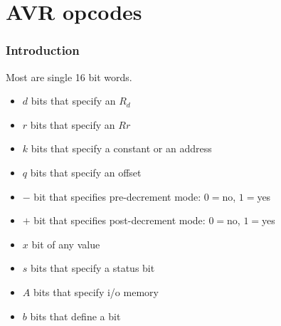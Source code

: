 \documentclass{beamer}
\begin{document}
\section{AVR opcodes}
\begin{frame}
\frametitle{Introduction}
Most are single 16 bit words.
\\
\begin{itemize}
\item  $d$  bits that specify an $R_d$\\
\item  $r$  bits that specify an $Rr$ \\
\item  $k$  bits that specify a constant or an address\\
\item  $q$  bits that specify an offset\\
\item  $-$  bit that specifies pre-decrement mode: $0=$no, $1=$yes\\
\item  $+$  bit that specifies post-decrement mode: $0=$no, $1=$yes\\
\item  $x$  bit of any value\\
\item  $s$  bits that specify a status bit\\
\item  $A$  bits that specify i/o memory\\
\item  $b$  bits that define a bit\\
\end{itemize}
\end{frame}
\end{document}
